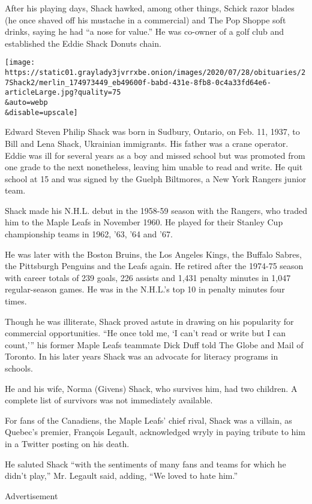 After his playing days, Shack hawked, among other things, Schick razor
blades (he once shaved off his mustache in a commercial) and The Pop
Shoppe soft drinks, saying he had ``a nose for value.'' He was co-owner
of a golf club and established the Eddie Shack Donuts chain.

\texttt{[image: https://static01.graylady3jvrrxbe.onion/images/2020/07/28/obituaries/27Shack2/merlin\_174973449\_eb49600f-babd-431e-8fb8-0c4a33fd64e6-articleLarge.jpg?quality=75\\\&auto=webp\\\&disable=upscale]}

Edward Steven Philip Shack was born in Sudbury, Ontario, on Feb. 11,
1937, to Bill and Lena Shack, Ukrainian immigrants. His father was a
crane operator. Eddie was ill for several years as a boy and missed
school but was promoted from one grade to the next nonetheless, leaving
him unable to read and write. He quit school at 15 and was signed by the
Guelph Biltmores, a New York Rangers junior team.

Shack made his N.H.L. debut in the 1958-59 season with the Rangers, who
traded him to the Maple Leafs in November 1960. He played for their
Stanley Cup championship teams in 1962, '63, '64 and '67.

He was later with the Boston Bruins, the Los Angeles Kings, the Buffalo
Sabres, the Pittsburgh Penguins and the Leafs again. He retired after
the 1974-75 season with career totals of 239 goals, 226 assists and
1,431 penalty minutes in 1,047 regular-season games. He was in the
N.H.L.'s top 10 in penalty minutes four times.

Though he was illiterate, Shack proved astute in drawing on his
popularity for commercial opportunities. ``He once told me, `I can't
read or write but I can count,''' his former Maple Leafs teammate Dick
Duff told The Globe and Mail of Toronto. In his later years Shack was an
advocate for literacy programs in schools.

He and his wife, Norma (Givens) Shack, who survives him, had two
children. A complete list of survivors was not immediately available.

For fans of the Canadiens, the Maple Leafs' chief rival, Shack was a
villain, as Quebec's premier, François Legault, acknowledged wryly in
paying tribute to him in a Twitter posting on his death.

He saluted Shack ``with the sentiments of many fans and teams for which
he didn't play,'' Mr. Legault said, adding, ``We loved to hate him.''

Advertisement

